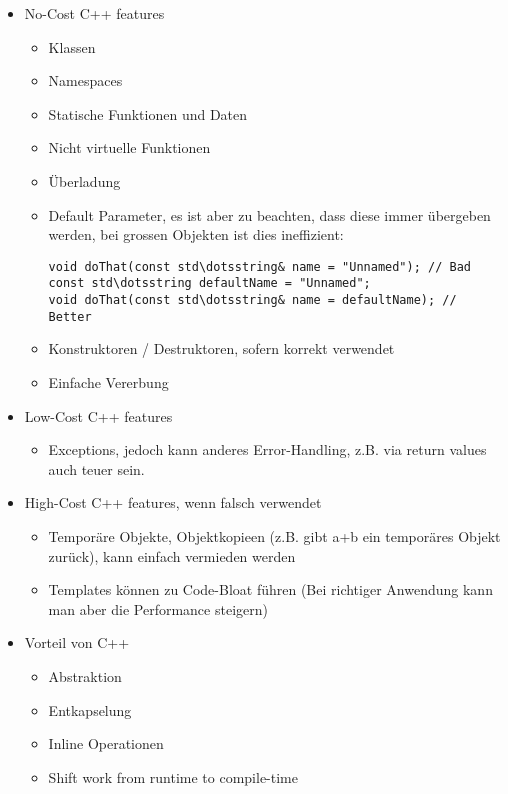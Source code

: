 \begin{itemize}
	\item No-Cost C++ features
		\begin{itemize}
			\item Klassen
			\item Namespaces
			\item Statische Funktionen und Daten
			\item Nicht virtuelle Funktionen
			\item Überladung
			\item Default Parameter, es ist aber zu beachten, dass diese immer übergeben werden, bei grossen Objekten ist dies ineffizient:
				\begin{lstlisting}
void doThat(const std\dotsstring& name = "Unnamed"); // Bad
const std\dotsstring defaultName = "Unnamed";
void doThat(const std\dotsstring& name = defaultName); // Better
				\end{lstlisting}
			\item  Konstruktoren / Destruktoren, sofern korrekt verwendet
			\item Einfache Vererbung
		\end{itemize}
	\item Low-Cost C++ features
		\begin{itemize}
			\item Exceptions, jedoch kann anderes Error-Handling, z.B. via return values auch teuer sein.
		\end{itemize}
	\item High-Cost C++ features, wenn falsch verwendet
		\begin{itemize}
			\item Temporäre Objekte, Objektkopieen (z.B. gibt a+b ein temporäres Objekt zurück), kann einfach vermieden werden
			\item Templates können zu Code-Bloat führen (Bei richtiger Anwendung kann man aber die Performance steigern)
		\end{itemize}
	\item Vorteil von C++
    	\begin{itemize}
	        \item Abstraktion
	        \item Entkapselung
	        \item Inline Operationen
	        \item Shift work from runtime to compile-time
    	\end{itemize}
\end{itemize}


